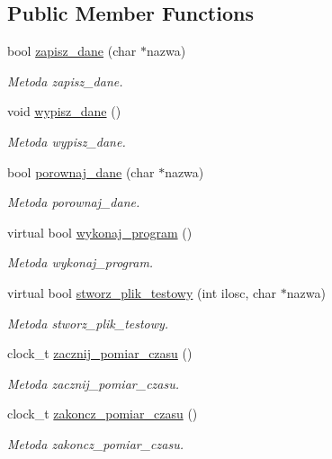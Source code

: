 \subsection*{Public Member Functions}
\begin{DoxyCompactItemize}
\item 
bool \hyperlink{class_program_aaef7fcaf64830eb231cbb9e887d705af}{zapisz\+\_\+dane} (char $\ast$nazwa)
\begin{DoxyCompactList}\small\item\em Metoda zapisz\+\_\+dane. \end{DoxyCompactList}\item 
void \hyperlink{class_program_a060ea3afebf696152d50135d20856e5a}{wypisz\+\_\+dane} ()
\begin{DoxyCompactList}\small\item\em Metoda wypisz\+\_\+dane. \end{DoxyCompactList}\item 
bool \hyperlink{class_program_ab5441e0e8ecd02ffeada4d77aaad2726}{porownaj\+\_\+dane} (char $\ast$nazwa)
\begin{DoxyCompactList}\small\item\em Metoda porownaj\+\_\+dane. \end{DoxyCompactList}\item 
virtual bool \hyperlink{class_program_ac396401ba5cade863d0e6acb727bec4e}{wykonaj\+\_\+program} ()
\begin{DoxyCompactList}\small\item\em Metoda wykonaj\+\_\+program. \end{DoxyCompactList}\item 
virtual bool \hyperlink{class_program_a7fa8a33fb88f842b544e6d65c23022c3}{stworz\+\_\+plik\+\_\+testowy} (int ilosc, char $\ast$nazwa)
\begin{DoxyCompactList}\small\item\em Metoda stworz\+\_\+plik\+\_\+testowy. \end{DoxyCompactList}\item 
clock\+\_\+t \hyperlink{class_program_ab68c69977637eb8cc05a57e176a21986}{zacznij\+\_\+pomiar\+\_\+czasu} ()
\begin{DoxyCompactList}\small\item\em Metoda zacznij\+\_\+pomiar\+\_\+czasu. \end{DoxyCompactList}\item 
clock\+\_\+t \hyperlink{class_program_a3515568f8df7224bfd8fd8b7b76ab0ba}{zakoncz\+\_\+pomiar\+\_\+czasu} ()
\begin{DoxyCompactList}\small\item\em Metoda zakoncz\+\_\+pomiar\+\_\+czasu. \end{DoxyCompactList}\item 

\end{DoxyCompactItemize}
